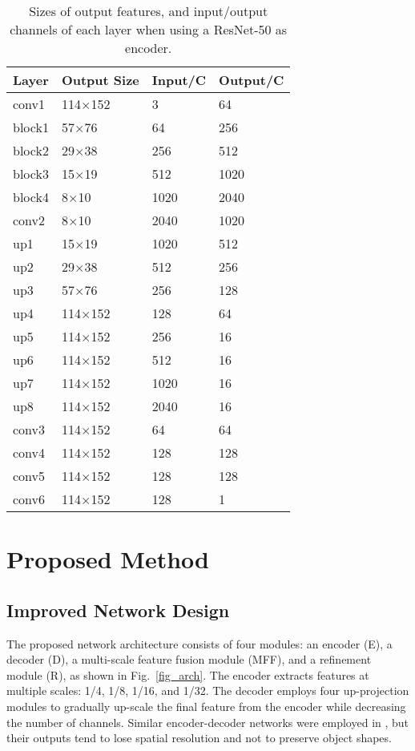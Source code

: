 \documentclass[10pt,twocolumn,letterpaper]{article}
\begin{document}
\begin{table}[t]
\centering  
\caption{Sizes of output features, and input/output channels of each layer when using a ResNet-50 as encoder.}
\begin{tabular}{|l|p{}<{\centering}|p{}<{\centering}|p{}<{\centering}|} 
\hline 
Layer  &Output Size   &Input/C &Output/C \\ 
\hline\hline
conv1  &114$\times$152 &3 &64 \\
block1   &57$\times$76 &64 &256 \\
block2  &29$\times$38  &256 &512 \\  
block3  &15$\times$19  &512 &1020 \\  
block4  &8$\times$10  &1020 &2040 \\  \hline
conv2   &8$\times$10  &2040 &1020 \\  
up1   &15$\times$19 &1020 &512 \\ 
up2  &29$\times$38 &512 &256 \\ 
up3   &57$\times$76 &256 &128 \\ 
up4  &114$\times$152 &128 &64 \\  \hline
up5  &114$\times$152 &256 &16 \\ 
up6  &114$\times$152 &512 &16 \\ 
up7  &114$\times$152 &1020 &16 \\ 
up8  &114$\times$152 &2040 &16 \\ 
conv3 &114$\times$152  &64 &64 \\ \hline
conv4 &114$\times$152  &128 &128 \\
conv5 &114$\times$152  &128 &128\\
conv6 &114$\times$152  &128 &1 \\ \hline
\end{tabular}
\label{table_arch}
\end{table}

\section{Proposed Method}
\subsection{Improved Network Design}

The proposed network architecture consists of four modules: an encoder (E), a decoder (D), a multi-scale feature fusion module (MFF), and a refinement module (R), as shown in Fig.~\ref{fig_arch}. The encoder extracts features at multiple scales: 1/4, 1/8, 1/16, and 1/32. 
The decoder employs four up-projection modules \cite{laina2016deeper} to gradually up-scale the final feature from the encoder while decreasing the number of channels. Similar encoder-decoder networks were employed in \cite{laina2016deeper,ma2017sparse}, but
their outputs tend to lose spatial resolution and not to preserve object shapes. 
\end{document}
